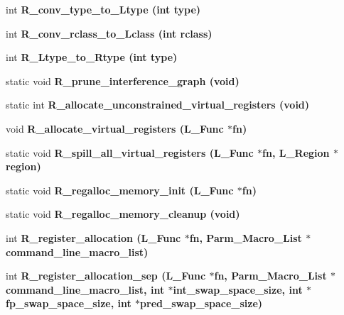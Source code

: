 \begin{CompactItemize}
int \bf{R\_\-conv\_\-type\_\-to\_\-Ltype} (int type)
\item 
int \bf{R\_\-conv\_\-rclass\_\-to\_\-Lclass} (int rclass)
\item 
int \bf{R\_\-Ltype\_\-to\_\-Rtype} (int type)
\item 
static void \bf{R\_\-prune\_\-interference\_\-graph} (void)
\item 
static int \bf{R\_\-allocate\_\-unconstrained\_\-virtual\_\-registers} (void)
\item 
void \bf{R\_\-allocate\_\-virtual\_\-registers} (L\_\-Func $\ast$fn)
\item 
static void \bf{R\_\-spill\_\-all\_\-virtual\_\-registers} (L\_\-Func $\ast$fn, L\_\-Region $\ast$\bf{region})
\item 
static void \bf{R\_\-regalloc\_\-memory\_\-init} (L\_\-Func $\ast$fn)
\item 
static void \bf{R\_\-regalloc\_\-memory\_\-cleanup} (void)
\item 
int \bf{R\_\-register\_\-allocation} (L\_\-Func $\ast$fn, \bf{Parm\_\-Macro\_\-List} $\ast$command\_\-line\_\-macro\_\-list)
\item 
int \bf{R\_\-register\_\-allocation\_\-sep} (L\_\-Func $\ast$fn, \bf{Parm\_\-Macro\_\-List} $\ast$command\_\-line\_\-macro\_\-list, int $\ast$int\_\-swap\_\-space\_\-size, int $\ast$fp\_\-swap\_\-space\_\-size, int $\ast$pred\_\-swap\_\-space\_\-size)
\end{CompactItemize}
